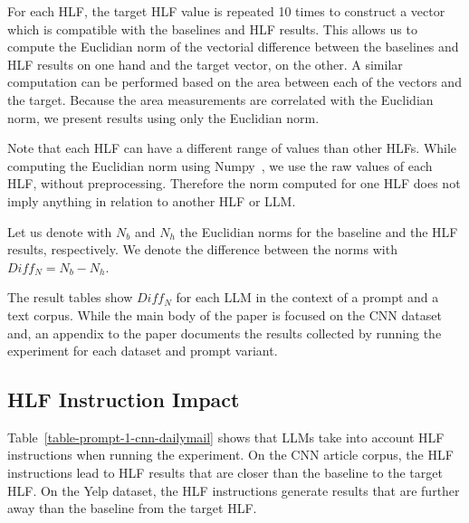 \documentclass[a4paper,twoside]{article}
\begin{document}
For each HLF, the target HLF value is repeated 10 times to construct a vector
which is compatible with the baselines and HLF results.
This allows us to compute the Euclidian norm of the vectorial difference between
the baselines and HLF results on one hand and the target vector, on the other.
A similar computation can be performed based on the area between each of the
vectors and the target.
Because the area measurements are correlated with the Euclidian norm, we present
results using only the Euclidian norm.

Note that each HLF can have a different range of values than other HLFs.
While computing the Euclidian norm using Numpy~\cite{harris2020array}, we use
the raw values of each HLF, without preprocessing.
Therefore the norm computed for one HLF does not imply anything in relation to
another HLF or LLM.\@

Let us denote with $N_b$ and $N_h$ the Euclidian norms for the baseline and the
HLF results, respectively.
We denote the difference between the norms with $Diff_N = N_b - N_h$.

The result tables show $Diff_N$ for each LLM in the context of a prompt and a
text corpus.
While the main body of the paper is focused on the CNN dataset and, an appendix
to the paper documents the results collected by running the experiment for each
dataset and prompt variant.

\subsection{HLF Instruction Impact}

Table~\ref{table-prompt-1-cnn-dailymail} shows that LLMs take into account
HLF instructions when running the experiment.
On the CNN article corpus, the HLF instructions lead to HLF results that are
closer than the baseline to the target HLF.\@
On the Yelp dataset, the HLF instructions generate results that are further away
than the baseline from the target HLF.\@
\end{document}
